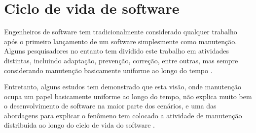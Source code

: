 \section{Ciclo de vida de software}
\label{sec:ciclo}


Engenheiros de software tem tradicionalmente considerado qualquer trabalho após
o primeiro lançamento de um software simplesmente como manutenção. Alguns
pesquisadores no entanto tem dividido este trabalho em atividades distintas, incluindo
adaptação, prevenção, correção, entre outras, mas sempre considerando manutenção
basicamente uniforme ao longo do tempo \cite{rajlich2000staged}.

Entretanto, alguns estudos tem demonstrado que esta visão, onde manutenção
ocupa um papel basicamente uniforme ao longo do tempo, não explica muito bem o
desenvolvimento de software na maior parte dos cenários, e uma das abordagens
para explicar o fenômeno tem colocado a atividade de manutenção distribuída ao
longo do ciclo de vida do software \cite{rajlich2000staged}.

